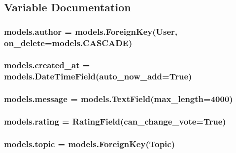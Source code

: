 \subsection{Variable Documentation}
\subsubsection[{\texorpdfstring{author}{author}}]{\setlength{\rightskip}{0pt plus 5cm}models.\+author = models.\+Foreign\+Key(User, on\+\_\+delete=models.\+C\+A\+S\+C\+A\+DE)}\hypertarget{namespacemodels_af792ae344613dd8aefd3747f5f3eddc7}{}\label{namespacemodels_af792ae344613dd8aefd3747f5f3eddc7}
\subsubsection[{\texorpdfstring{created\+\_\+at}{created_at}}]{\setlength{\rightskip}{0pt plus 5cm}models.\+created\+\_\+at = models.\+Date\+Time\+Field(auto\+\_\+now\+\_\+add=True)}\hypertarget{namespacemodels_a9bb14e7932cf7d4a1edb2cbd5f0a0a07}{}\label{namespacemodels_a9bb14e7932cf7d4a1edb2cbd5f0a0a07}
\subsubsection[{\texorpdfstring{message}{message}}]{\setlength{\rightskip}{0pt plus 5cm}models.\+message = models.\+Text\+Field(max\+\_\+length=4000)}\hypertarget{namespacemodels_a9ef45fab8b6b74563fec302f2c099493}{}\label{namespacemodels_a9ef45fab8b6b74563fec302f2c099493}
\subsubsection[{\texorpdfstring{rating}{rating}}]{\setlength{\rightskip}{0pt plus 5cm}models.\+rating = Rating\+Field(can\+\_\+change\+\_\+vote=True)}\hypertarget{namespacemodels_abdb4a4ceda0315525a6b6053f76cca87}{}\label{namespacemodels_abdb4a4ceda0315525a6b6053f76cca87}
\subsubsection[{\texorpdfstring{topic}{topic}}]{\setlength{\rightskip}{0pt plus 5cm}models.\+topic = models.\+Foreign\+Key({\bf Topic})}\hypertarget{namespacemodels_ac6c97c7b2843a1f154a040112c9cfeb0}{}\label{namespacemodels_ac6c97c7b2843a1f154a040112c9cfeb0}
